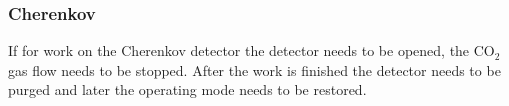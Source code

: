 \begin{safetyen}{0}{0}
\subsubsection{Cherenkov}

If for work on the Cherenkov detector the detector needs to be opened, 
the CO$_2$ gas flow needs to be stopped. After the work is finished the 
detector needs to be purged and later the operating mode needs to be restored.

\end{safetyen}



%
%
